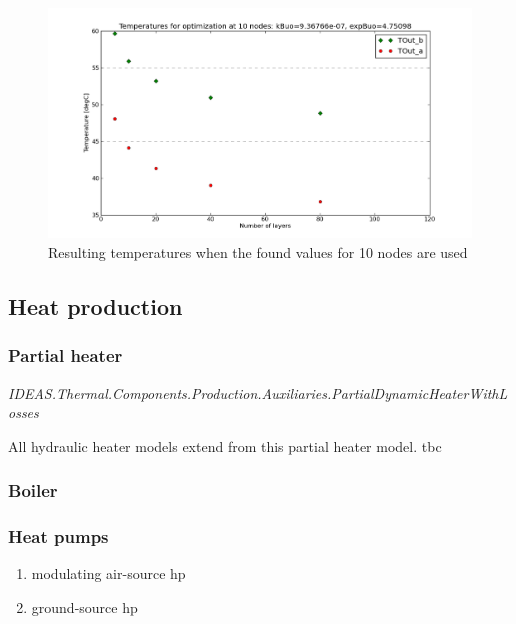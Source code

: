 \begin{figure}%
\begin{left}
\includegraphics[width=\columnwidth]{Thermal/images/Validation_Vitocell100V390l_ChargingTimeEndTemperatures_nonlin_10nodes.png}%
\caption{Resulting temperatures when the found values for 10 nodes are used}%
\label{tankinternal}%
\end{left}
\end{figure}


\subsection{Heat production}

\subsubsection{Partial heater}

\emph{IDEAS.Thermal.Components.Production.Auxiliaries.PartialDynamicHeaterWithLosses}

\vspace{6mm}

All hydraulic heater models extend from this partial heater model.  
tbc

\subsubsection{Boiler}

\subsubsection{Heat pumps}

\begin{enumerate}
	\item modulating air-source hp
	\item ground-source hp
\end{enumerate}

